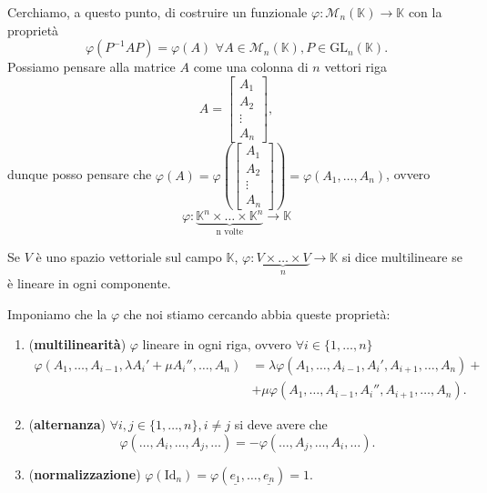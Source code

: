 Cerchiamo, a questo punto, di costruire un funzionale $\varphi: \mathcal{M}_n(\mathbb{K}) \to \mathbb{K}$ con la proprietà
$$
    \varphi(P^{-1}AP) = \varphi(A) \, \, \forall A \in \mathcal{M}_n(\mathbb{K}), P \in \text{GL}_n(\mathbb{K}).
$$
Possiamo pensare alla matrice $A$ come una colonna di $n$ vettori riga
$$
    A = \left[ \begin{array}{c}
        A_1 \\
        \hline
        A_2 \\
        \hline
        \vdots \\
        \hline
        A_n
    \end{array} \right],
$$
dunque posso pensare che $\varphi(A) = \varphi\left(\left[ \begin{array}{c}
        A_1 \\
        \hline
        A_2 \\
        \hline
        \vdots \\
        \hline
        A_n
    \end{array} \right]\right) = \varphi(A_1, \ldots, A_n)$, ovvero 
$$
    \varphi: \underbrace{\mathbb{K}^n \times \ldots \times \mathbb{K}^n}_{\text{n volte}} \to \mathbb{K}
$$
\begin{definition}[multilinearità]
    Se $V$ è uno spazio vettoriale sul campo $\mathbb{K}$, $\varphi: \underbrace{V \times \ldots \times V}_{n} \to \mathbb{K}$ si dice multilineare se è lineare in ogni componente.
\end{definition}
Imponiamo che la $\varphi$ che noi stiamo cercando abbia queste proprietà:
\begin{enumerate}[label=\protect\circled{\arabic*}]
    \item (\textbf{multilinearità}) $\varphi$ lineare in ogni riga, ovvero $\forall i \in \{ 1, \ldots, n \}$
    \begin{align}
        \varphi(A_1, \ldots, A_{i-1}, \lambda A_i' + \mu A_i'', \ldots, A_n) &= \lambda \varphi(A_1, \ldots, A_{i-1}, A_i', A_{i+1}, \ldots, A_n) + \\
        &+\mu \varphi(A_1, \ldots, A_{i-1}, A_i'', A_{i+1}, \ldots, A_n).
    \end{align}
    \item (\textbf{alternanza}) $\forall i,j \in \{ 1, \ldots, n \}, i \neq j$ si deve avere che
    $$
        \varphi(\ldots, A_i, \ldots, A_j, \ldots) = -\varphi(\ldots, A_j, \ldots, A_i, \ldots).
    $$
    \item (\textbf{normalizzazione}) $\varphi(\text{Id}_n) = \varphi(\underline{e_1}, \ldots, \underline{e_n}) = 1$.
\end{enumerate}

